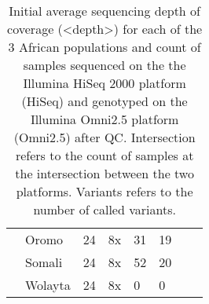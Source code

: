\begin{table}[h]
{\begin{tabular}{llllllll}
                          & Oromo   & 24                                                      & 8x                            & 31                                                     & 19                                                            &                                                          &                                                         \\ \cline{2-6}
                          & Somali  & 24                                                      & 8x                            & 52                                                     & 20                                                            &                                                          &                                                         \\ \cline{2-6}
                          & Wolayta & 24                                                      & 8x                            & 0                                                      & 0                                                             &                                                          &                                                         \\ \hline
\end{tabular}
}
\caption[Summary statistics of sample and SNP count for SNP array and sequence data.]{Initial average sequencing depth of coverage (<depth>) for each of the 3 African populations and count of samples sequenced on the the Illumina HiSeq 2000 platform (HiSeq) and genotyped on the Illumina Omni2.5 platform (Omni2.5) after \gls{QC}. Intersection refers to the count of samples at the intersection between the two platforms. Variants refers to the number of called variants.}
\label{tab:samples}
\end{table}